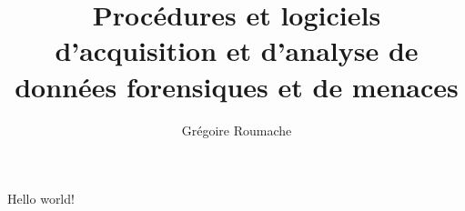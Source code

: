 \documentclass[a4paper, 12pt]{book}
\title{Procédures et logiciels d'acquisition et d'analyse de données forensiques et de menaces}
\author{Grégoire Roumache}
\begin{document}
\maketitle

Hello world!
\end{document}
